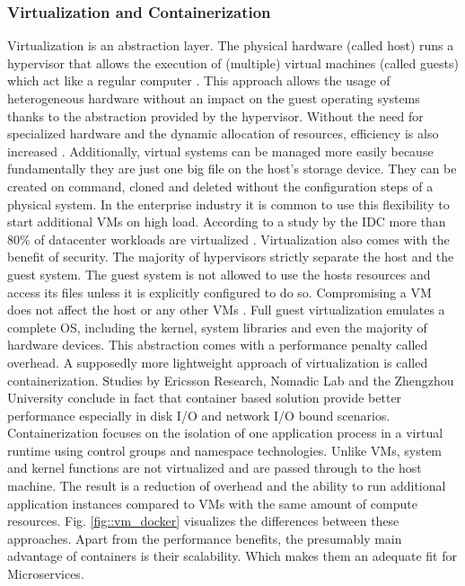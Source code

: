 \documentclass[12pt, a4paper]{article}
\begin{document}
        \subsubsection{Virtualization and Containerization}
        Virtualization is an abstraction layer. The physical hardware (called host) runs a hypervisor that allows the execution of (multiple) virtual machines (called guests) which act like a regular computer \cite{vmbasics}. This approach allows the usage of heterogeneous hardware without an impact on the guest operating systems thanks to the abstraction provided by the hypervisor. Without the need for specialized hardware and the dynamic allocation of resources, efficiency is also increased \cite{redhat_venv}. Additionally, virtual systems can be managed more easily because fundamentally they are just one big file on the host's storage device. They can be created on command, cloned and deleted without the configuration steps of a physical system. In the enterprise industry it is common to use this flexibility to start additional \ac{VM}s on high load. According to a study by the \ac{IDC} more than 80\% of datacenter workloads are virtualized \cite{virtualaddoption}. Virtualization also comes with the benefit of security. The majority of hypervisors strictly separate the host and the guest system. The guest system is not allowed to use the hosts resources and access its files unless it is explicitly configured to do so. Compromising a \ac{VM} does not affect the host or any other \ac{VM}s \cite{redhat_venv}.\newline
        Full guest virtualization emulates a complete \ac{OS}, including the kernel, system libraries and even the majority of hardware devices. This abstraction comes with a performance penalty called overhead. A supposedly more lightweight approach of virtualization is called containerization. Studies by Ericsson Research, Nomadic Lab \cite{ieee_perfomance} and the Zhengzhou University \cite{zhengzhou_university} conclude in fact that container based solution provide better performance especially in disk \acs{I/O} and network \acs{I/O} bound scenarios. Containerization focuses on the isolation of one application process in a virtual runtime using control groups and namespace technologies. Unlike \ac{VM}s, system and kernel functions are not virtualized and are passed through to the host machine. The result is a reduction of overhead and the ability to run additional application instances compared to \ac{VM}s with the same amount of compute resources. Fig. \ref{fig::vm_docker} visualizes the differences between these approaches.\newline
        Apart from the performance benefits, the presumably main advantage of containers is their scalability. Which makes them an adequate fit for Microservices.
\end{document}
